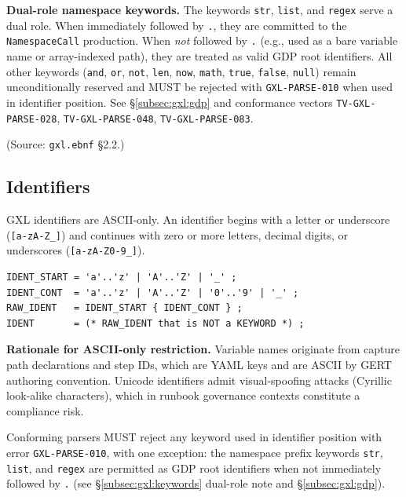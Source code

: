 \noindent\textbf{Dual-role namespace keywords.}
The keywords \texttt{str}, \texttt{list}, and \texttt{regex} serve a dual role.
When immediately followed by \texttt{.}, they are committed to the
\texttt{NamespaceCall} production.
When \emph{not} followed by \texttt{.} (e.g., used as a bare variable name or
array-indexed path), they are treated as valid GDP root identifiers.
All other keywords (\texttt{and}, \texttt{or}, \texttt{not}, \texttt{len},
\texttt{now}, \texttt{math}, \texttt{true}, \texttt{false}, \texttt{null})
remain unconditionally reserved and MUST be rejected with
\texttt{GXL-PARSE-010} when used in identifier position.
See \S\ref{subsec:gxl:gdp} and conformance vectors
\texttt{TV-GXL-PARSE-028}, \texttt{TV-GXL-PARSE-048}, \texttt{TV-GXL-PARSE-083}.

(Source: \texttt{gxl.ebnf} \S2.2.)

\subsection{Identifiers}
\label{subsec:gxl:identifiers}

GXL identifiers are ASCII-only.  An identifier begins with a letter or
underscore (\texttt{[a-zA-Z\_]}) and continues with zero or more letters,
decimal digits, or underscores (\texttt{[a-zA-Z0-9\_]}).

\begin{verbatim}
IDENT_START = 'a'..'z' | 'A'..'Z' | '_' ;
IDENT_CONT  = 'a'..'z' | 'A'..'Z' | '0'..'9' | '_' ;
RAW_IDENT   = IDENT_START { IDENT_CONT } ;
IDENT       = (* RAW_IDENT that is NOT a KEYWORD *) ;
\end{verbatim}

\noindent\textbf{Rationale for ASCII-only restriction.}
Variable names originate from capture path declarations and step IDs,
which are YAML keys and are ASCII by GERT authoring convention.
Unicode identifiers admit visual-spoofing attacks (Cyrillic look-alike
characters), which in runbook governance contexts constitute a compliance risk.

Conforming parsers MUST reject any keyword used in identifier position with
error \texttt{GXL-PARSE-010}, with one exception: the namespace prefix
keywords \texttt{str}, \texttt{list}, and \texttt{regex} are permitted as GDP
root identifiers when not immediately followed by \texttt{.} (see
\S\ref{subsec:gxl:keywords} dual-role note and \S\ref{subsec:gxl:gdp}).

